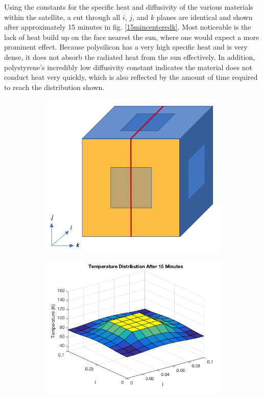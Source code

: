 \documentclass[12pt]{article}
\begin{document}
Using the constants for the specific heat and diffusivity of the various materials within the satellite, a cut through all $i$, $j$, and $k$ planes are identical and shown after approximately 15 minutes in fig. \ref{15mincenteredk}.  Most noticeable is the lack of heat build up on the face nearest the sun, where one would expect a more prominent effect.  Because polysilicon has a very high specific heat and is very dense, it does not absorb the radiated heat from the sun effectively. \cite{polysilicon}  In addition, polystyrene's incredibly low diffusivity constant indicates the material does not conduct heat very quickly, which is also reflected by the amount of time required to reach the distribution shown. \cite{polystyrene}

\begin{figure}[h!]
\begin{center}
\begin{subfigure}{0.3\textwidth}
\includegraphics[width=\linewidth]{../pics/centeredkpic.png}
\caption{\label{15minkpic}}
\end{subfigure}
\begin{subfigure}{0.6\textwidth}
\includegraphics[width=\linewidth]{../pics/15mincenteredk.png}

\end{subfigure}
\end{center}
\end{figure}
\end{document}
